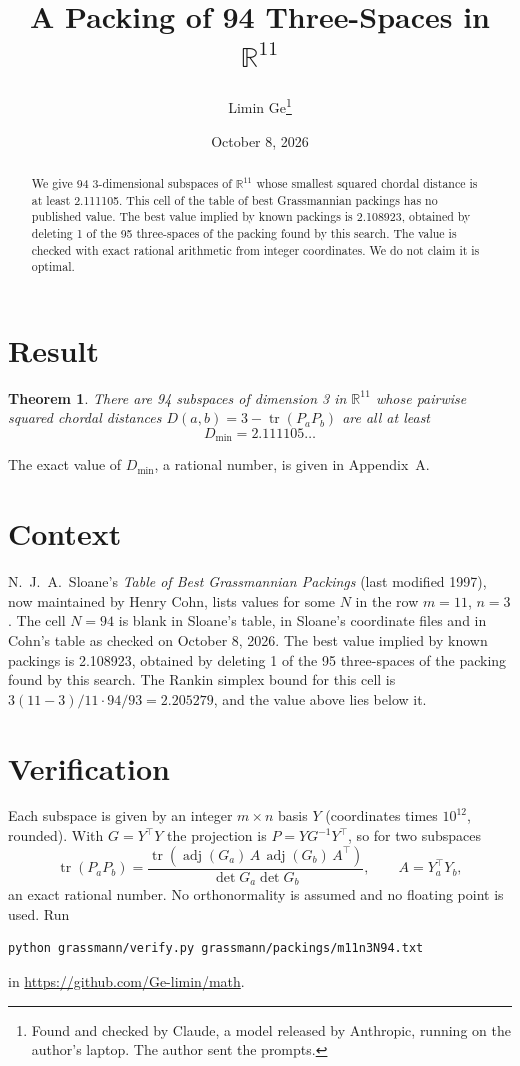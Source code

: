 \documentclass[11pt,a4paper]{article}
\title{A Packing of 94 Three-Spaces in $\mathbb{R}^{11}$}
\author{Limin Ge\thanks{Found and checked by Claude, a model released by Anthropic, running on the author's laptop. The author sent the prompts.}}
\date{October 8, 2026}
\newtheorem*{theorem}{Theorem}
\begin{document}
\maketitle
\begin{abstract}
We give 94 3-dimensional subspaces of $\mathbb{R}^{11}$ whose smallest squared chordal distance is at least 2.111105. This cell of the table of best Grassmannian packings has no published value. The best value implied by known packings is 2.108923, obtained by deleting 1 of the 95 three-spaces of the packing found by this search. The value is checked with exact rational arithmetic from integer coordinates. We do not claim it is optimal.
\end{abstract}

\section{Result}
\begin{theorem}
There are 94 subspaces of dimension 3 in $\mathbb{R}^{11}$ whose pairwise squared chordal distances $D(a,b) = 3 - \operatorname{tr}(P_aP_b)$ are all at least
\[ D_{\min} = 2.111105\ldots \]
\end{theorem}
The exact value of $D_{\min}$, a rational number, is given in Appendix~A.


\section{Context}
N.~J.~A.~Sloane's \emph{Table of Best Grassmannian Packings} (last modified 1997), now maintained by Henry Cohn, lists values for some $N$ in the row $m=11$, $n=3$. The cell $N=94$ is blank in Sloane's table, in Sloane's coordinate files and in Cohn's table as checked on October 8, 2026. The best value implied by known packings is 2.108923, obtained by deleting 1 of the 95 three-spaces of the packing found by this search. The Rankin simplex bound for this cell is $3(11-3)/11\cdot 94/93 = 2.205279$, and the value above lies below it.


\section{Verification}
Each subspace is given by an integer $m\times n$ basis $Y$ (coordinates times $10^{12}$, rounded). With $G=Y^\top Y$ the projection is $P=YG^{-1}Y^\top$, so for two subspaces
\[ \operatorname{tr}(P_aP_b)=\frac{\operatorname{tr}(\operatorname{adj}(G_a)\,A\,\operatorname{adj}(G_b)\,A^\top)}{\det G_a\det G_b},\qquad A=Y_a^\top Y_b, \]
an exact rational number. No orthonormality is assumed and no floating point is used. Run
\begin{verbatim}
python grassmann/verify.py grassmann/packings/m11n3N94.txt
\end{verbatim}
in \url{https://github.com/Ge-limin/math}.
\end{document}
